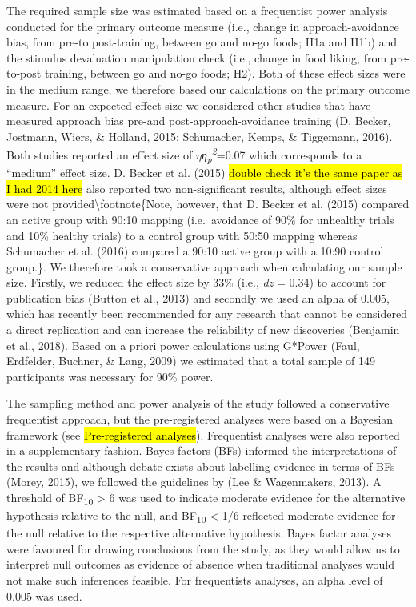 \documentclass[man,floatsintext]{apa6}
\begin{document}
The required sample size was estimated based on a frequentist power
analysis conducted for the primary outcome measure (i.e., change in
approach-avoidance bias, from pre-to post-training, between go and no-go
foods; H1a and H1b) and the stimulus devaluation manipulation check
(i.e., change in food liking, from pre-to-post training, between go and
no-go foods; H2). Both of these effect sizes were in the medium range,
we therefore based our calculations on the primary outcome measure. For
an expected effect size we considered other studies that have measured
approach bias pre-and post-approach-avoidance training (D. Becker,
Jostmann, Wiers, \& Holland, 2015; Schumacher, Kemps, \& Tiggemann,
2016). Both studies reported an effect size of
\textit{$\eta$η\textsubscript{p}\textsuperscript{2}}=0.07 which
corresponds to a \enquote{medium} effect size. D. Becker et al. (2015)
\hl{double check it's the same paper as I had 2014 here} also reported
two non-significant results, although effect sizes were not
provided\textbackslash{}footnote\{Note, however, that D. Becker et al.
(2015) compared an active group with 90:10 mapping (i.e.~avoidance of
90\% for unhealthy trials and 10\% healthy trials) to a control group
with 50:50 mapping whereas Schumacher et al. (2016) compared a 90:10
active group with a 10:90 control group.\}. We therefore took a
conservative approach when calculating our sample size. Firstly, we
reduced the effect size by 33\% (i.e., \textit{dz} = 0.34) to account
for publication bias (Button et al., 2013) and secondly we used an alpha
of 0.005, which has recently been recommended for any research that
cannot be considered a direct replication and can increase the
reliability of new discoveries (Benjamin et al., 2018). Based on a
priori power calculations using G*Power (Faul, Erdfelder, Buchner, \&
Lang, 2009) we estimated that a total sample of 149 participants was
necessary for 90\% power.

\par  

The sampling method and power analysis of the study followed a
conservative frequentist approach, but the pre-registered analyses were
based on a Bayesian framework (see \hl{Pre-registered analyses}).
Frequentist analyses were also reported in a supplementary fashion.
Bayes factors (BFs) informed the interpretations of the results and
although debate exists about labelling evidence in terms of BFs (Morey,
2015), we followed the guidelines by (Lee \& Wagenmakers, 2013). A
threshold of BF\textsubscript{10} \textgreater{} 6 was used to indicate
moderate evidence for the alternative hypothesis relative to the null,
and BF\textsubscript{10} \textless{} 1/6 reflected moderate evidence for
the null relative to the respective alternative hypothesis. Bayes factor
analyses were favoured for drawing conclusions from the study, as they
would allow us to interpret null outcomes as evidence of absence when
traditional analyses would not make such inferences feasible. For
frequentists analyses, an alpha level of 0.005 was used.
\end{document}
